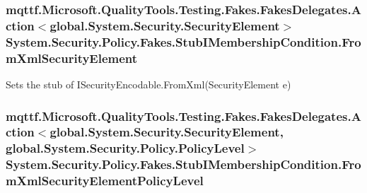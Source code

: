 \hypertarget{class_system_1_1_security_1_1_policy_1_1_fakes_1_1_stub_i_membership_condition_af987145a8493614d84b91f1bdd3d138f}{
\subsubsection[{From\-Xml\-Security\-Element}]{\setlength{\rightskip}{0pt plus 5cm}mqttf.\-Microsoft.\-Quality\-Tools.\-Testing.\-Fakes.\-Fakes\-Delegates.\-Action$<$global.\-System.\-Security.\-Security\-Element$>$ System.\-Security.\-Policy.\-Fakes.\-Stub\-I\-Membership\-Condition.\-From\-Xml\-Security\-Element}}\label{class_system_1_1_security_1_1_policy_1_1_fakes_1_1_stub_i_membership_condition_af987145a8493614d84b91f1bdd3d138f}


Sets the stub of I\-Security\-Encodable.\-From\-Xml(\-Security\-Element e)

\hypertarget{class_system_1_1_security_1_1_policy_1_1_fakes_1_1_stub_i_membership_condition_a128a0b1b14d5ab5fd6efdd2d209f32f6}{
\subsubsection[{From\-Xml\-Security\-Element\-Policy\-Level}]{\setlength{\rightskip}{0pt plus 5cm}mqttf.\-Microsoft.\-Quality\-Tools.\-Testing.\-Fakes.\-Fakes\-Delegates.\-Action$<$global.\-System.\-Security.\-Security\-Element, global.\-System.\-Security.\-Policy.\-Policy\-Level$>$ System.\-Security.\-Policy.\-Fakes.\-Stub\-I\-Membership\-Condition.\-From\-Xml\-Security\-Element\-Policy\-Level}}\label{class_system_1_1_security_1_1_policy_1_1_fakes_1_1_stub_i_membership_condition_a128a0b1b14d5ab5fd6efdd2d209f32f6}


